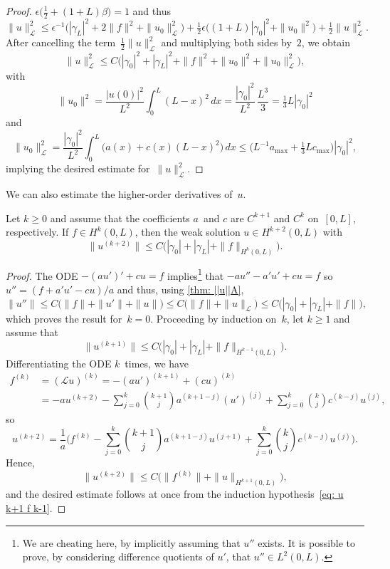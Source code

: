 \begin{proof}
$\epsilon\bigl(\tfrac12+(1+L)\beta\bigr)=1$ and thus
\[
\|u\|_{\mathcal{L}}^2
\le\epsilon^{-1}\bigl(|\gamma_L|^2+2\|f\|^2+\|u_0\|_{\mathcal{L}}^2\bigr)
+\tfrac12\epsilon\bigl((1+L)|\gamma_0|^2+\|u_0\|^2\bigr)
	+\tfrac12\|u\|_{\mathcal{L}}^2.
\]
After cancelling the term~$\tfrac12\|u\|_{\mathcal{L}}^2$ and multiplying both
sides by~$2$, we obtain
\[
\|u\|_{\mathcal{L}}^2\le C\bigl(|\gamma_0|^2+|\gamma_L|^2+\|f\|^2+\|u_0\|^2
	+\|u_0\|_{\mathcal{L}}^2\bigr),
\]
with
\[
\|u_0\|^2=\frac{|u(0)|^2}{L^2}\int_0^L(L-x)^2\,dx
	=\frac{|\gamma_0|^2}{L^2}\,\frac{L^3}{3}=\tfrac13L|\gamma_0|^2
\]
and
\[
\|u_0\|_{\mathcal{L}}^2=\frac{|\gamma_0|^2}{L^2}\int_0^L\bigl(
	a(x)+c(x)(L-x)^2\bigr)\,dx
	\le\bigl(L^{-1}a_{\max}+\tfrac13Lc_{\max}\bigr)|\gamma_0|^2,
\]
implying the desired estimate for~$\|u\|_{\mathcal{L}}^2$.
\end{proof}

We can also estimate the higher-order derivatives of~$u$.

\begin{theorem}\label{thm: regularity 1d}
Let $k\ge0$ and assume that the coefficients $a$~and $c$ are $C^{k+1}$ and
$C^k$ on~$[0,L]$, respectively.  If $f\in H^k(0,L)$, then the weak
solution $u\in H^{k+2}(0,L)$ with
\[
\|u^{(k+2)}\|\le C\bigl(|\gamma_0|+|\gamma_L|+\|f\|_{H^k(0,L)}\bigr).
\]
\end{theorem}
\begin{proof}
The ODE $-(au')'+cu=f$ implies\footnote{We are cheating here, by implicitly
assuming that $u''$ exists.  It is possible to prove, by considering difference
quotients of $u'$, that $u''\in L^2(0,L)$.} that $-au''-a'u'+cu=f$ so
$u''=(f+a'u'-cu)/a$ and thus, using \cref{thm: ||u||A},
\[
\|u''\|\le C\bigl(\|f\|+\|u'\|+\|u\|\bigr)
    \le C\bigl(\|f\|+\|u\|_{\mathcal{L}}\bigr)
    \le C\bigl(|\gamma_0|+|\gamma_L|+\|f\|\bigr),
\]
which proves the result for~$k=0$. Proceeding by induction on~$k$, let $k\ge1$
and assume that
\begin{equation}\label{eq: u k+1 f k-1}
\|u^{(k+1)}\|\le C\bigl(|\gamma_0|+|\gamma_L|+\|f\|_{H^{k-1}(0,L)}\bigr).
\end{equation}
Differentiating the ODE
$k$~times, we have
\begin{align*}
f^{(k)}&=(\mathcal{L}u)^{(k)}=-(au')^{(k+1)}+(cu)^{(k)}\\&
    =-au^{(k+2)}-\sum_{j=0}^k\binom{k+1}{j}a^{(k+1-j)}(u')^{(j)}
    +\sum_{j=0}^k\binom{k}{j}c^{(k-j)}u^{(j)},
\end{align*}
so
\[
u^{(k+2)}=\frac{1}{a}\biggl(f^{(k)}
    -\sum_{j=0}^k\binom{k+1}{j}a^{(k+1-j)}u^{(j+1)}
    +\sum_{j=0}^k\binom{k}{j}c^{(k-j)}u^{(j)}\biggr).
\]
Hence,
\[
\|u^{(k+2)}\|\le C\bigl(\|f^{(k)}\|+\|u\|_{H^{k+1}(0,L)}\bigr),
\]
and the desired estimate follows at once from the induction
hypothesis~\eqref{eq: u k+1 f k-1}.
\end{proof}


